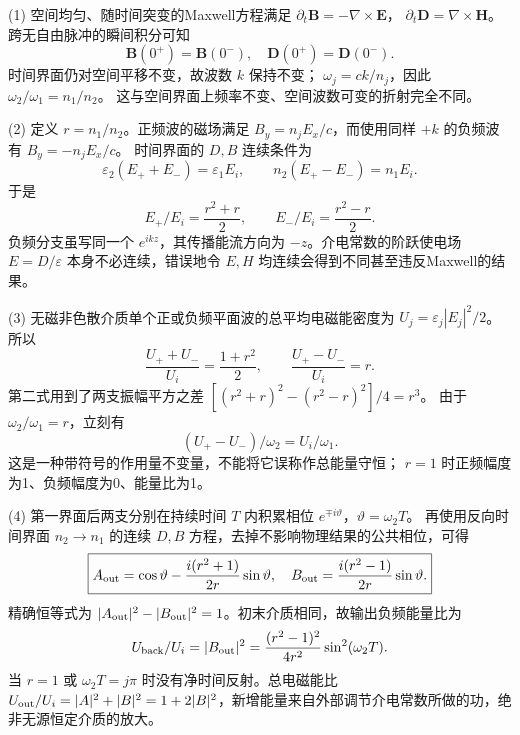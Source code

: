 (1) 空间均匀、随时间突变的Maxwell方程满足
\(\partial_t\mathbf B=-\nabla\times\mathbf E\)，
\(\partial_t\mathbf D=\nabla\times\mathbf H\)。
跨无自由脉冲的瞬间积分可知
\[
\mathbf B(0^+)=\mathbf B(0^-),\quad
\mathbf D(0^+)=\mathbf D(0^-).
\]
时间界面仍对空间平移不变，故波数 \(k\) 保持不变；
\(\omega_j=ck/n_j\)，因此
\(\omega_2/\omega_1=n_1/n_2\)。
这与空间界面上频率不变、空间波数可变的折射完全不同。

(2) 定义 \(r=n_1/n_2\)。正频波的磁场满足
\(B_y=n_jE_x/c\)，而使用同样 \(+k\) 的负频波有
\(B_y=-n_jE_x/c\)。
时间界面的 \(D,B\) 连续条件为
\[
\varepsilon_2(E_++E_-)=\varepsilon_1E_i,\qquad
n_2(E_+-E_-)=n_1E_i.
\]
于是
\[
\boxed{E_+/E_i=\frac{r^2+r}{2},\qquad
E_-/E_i=\frac{r^2-r}{2}.}
\]
负频分支虽写同一个 \(e^{ikz}\)，其传播能流方向为 \(-z\)。介电常数的阶跃使电场 \(E=D/\varepsilon\) 本身不必连续，错误地令 \(E,H\) 均连续会得到不同甚至违反Maxwell的结果。

(3) 无磁非色散介质单个正或负频平面波的总平均电磁能密度为
\(U_j=\varepsilon_j|E_j|^2/2\)。
所以
\[
\frac{U_++U_-}{U_i}=\frac{1+r^2}{2},\qquad
\frac{U_+-U_-}{U_i}=r.
\]
第二式用到了两支振幅平方之差
\([(r^2+r)^2-(r^2-r)^2]/4=r^3\)。
由于 \(\omega_2/\omega_1=r\)，立刻有
\[
(U_+-U_-)/\omega_2=U_i/\omega_1.
\]
这是一种带符号的作用量不变量，不能将它误称作总能量守恒；
\(r=1\) 时正频幅度为1、负频幅度为0、能量比为1。

(4) 第一界面后两支分别在持续时间 \(T\) 内积累相位
\(e^{\mp i\vartheta}\)，\(\vartheta=\omega_2T\)。
再使用反向时间界面 \(n_2\to n_1\) 的连续 \(D,B\) 方程，去掉不影响物理结果的公共相位，可得
\[
\boxed{A_{\rm out}=\cos\vartheta-\frac{i(r^2+1)}{2r}\sin\vartheta,\quad
B_{\rm out}=\frac{i(r^2-1)}{2r}\sin\vartheta.}
\]
精确恒等式为
\(|A_{\rm out}|^2-|B_{\rm out}|^2=1\)。初末介质相同，故输出负频能量比为
\[
U_{\rm back}/U_i=|B_{\rm out}|^2
=\frac{(r^2-1)^2}{4r^2}\sin^2(\omega_2T).
\]
当 \(r=1\) 或 \(\omega_2T=j\pi\) 时没有净时间反射。总电磁能比
\(U_{\rm out}/U_i=|A|^2+|B|^2=1+2|B|^2\)，新增能量来自外部调节介电常数所做的功，绝非无源恒定介质的放大。
